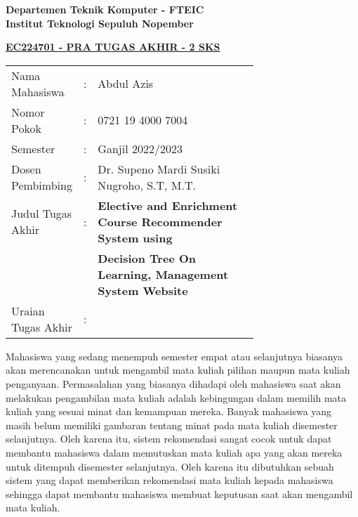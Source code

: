 \begin{flushleft}
  \textbf{Departemen Teknik Komputer - FTEIC}\\
  \textbf{Institut Teknologi Sepuluh Nopember}\\
\end{flushleft}

\begin{center}
  \underline{\textbf{EC224701 - PRA TUGAS AKHIR - 2 SKS}}
\end{center}

\begin{adjustwidth}{-0.2cm}{}
  \begin{tabular}{lcp{0.7\linewidth}}

    Nama Mahasiswa     & : & Abdul Azis                                                       \\
    Nomor Pokok        & : & 0721 19 4000 7004                                                \\

    Semester           & : & Ganjil 2022/2023                                                 \\

    Dosen Pembimbing   & : & Dr. Supeno Mardi Susiki Nugroho, S.T, M.T.                       \\
    Judul Tugas Akhir  & : & \textbf{Elective and Enrichment Course Recommender System using} \\
                       &   & \textbf{Decision Tree On Learning, Management System Website}    \\

    Uraian Tugas Akhir & : &                                                                  \\
  \end{tabular}
\end{adjustwidth}

Mahasiswa yang sedang menempuh semester empat atau selanjutnya biasanya akan merencanakan
untuk mengambil mata kuliah pilihan maupun mata kuliah penganyaan. Permasalahan yang biasanya dihadapi oleh mahasiswa
saat akan melakukan pengambilan mata kuliah adalah kebingungan dalam memilih mata kuliah
yang sesuai minat dan kemampuan mereka. Banyak mahasiswa yang masih belum memiliki gambaran
tentang minat pada mata kuliah disemester selanjutnya. Oleh karena itu, sistem rekomendasi
sangat cocok untuk dapat membantu mahasiswa dalam memutuskan mata kuliah apa yang akan mereka
untuk ditempuh disemester selanjutnya. Oleh karena itu dibutuhkan sebuah sistem yang dapat memberikan
rekomendasi mata kuliah kepada mahasiswa sehingga dapat membantu mahasiswa membuat keputusan saat akan
mengambil mata kuliah.
\vspace{1ex}

